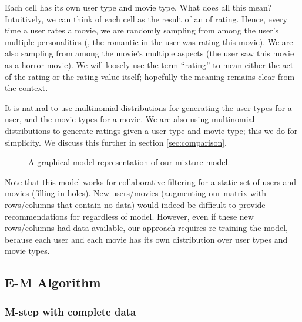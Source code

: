 \documentclass{article}
\begin{document}
Each cell has its own user type and movie type. What does all this
mean?  Intuitively, we can think of each cell as the result of an
 of rating. Hence, every time a user rates a movie, we are
randomly sampling from among the user's multiple personalities (\eg,
the romantic in the user was rating this movie). We are also sampling
from among the movie's multiple aspects (the user saw this movie as a
horror movie). We will loosely use the term ``rating'' to mean either
the act of the rating or the rating value itself; hopefully the
meaning remains clear from the context.

It is natural to use multinomial distributions for generating the user
types for a user, and the movie types for a movie. We are also using
multinomial distributions to generate ratings given a user type and
movie type; this we do for simplicity. We discuss this further in
section \ref{sec:comparison}.

\begin{figure}[ht]
  \begin{center}
    
  \end{center}
  \caption{A graphical model representation of our mixture model.}
  \label{fig:graphical}
\end{figure}

Note that this model works for collaborative filtering for a static
set of users and movies (filling in holes). New users/movies
(augmenting our matrix with rows/columns that contain no data) would
indeed be difficult to provide recommendations for regardless of
model. However, even if these new rows/columns had data available, our
approach requires re-training the model, because each user and each
movie has its own distribution over user types and movie types.

\subsection{E-M Algorithm}

\subsubsection{M-step with complete data}
\end{document}
